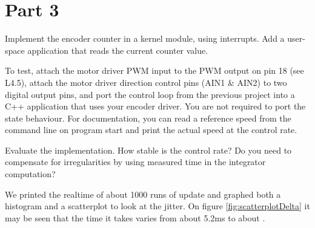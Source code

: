 \documentclass{article}
\begin{document}
\section{Part 3}

Implement the encoder counter in a kernel module, using interrupts.  Add a user-space application that reads the current counter value.

To test, attach the motor driver PWM input to the PWM output on pin 18 (see L4.5), attach the motor driver direction control pins (AIN1 & AIN2) to two digital output pins, and port the control loop from the previous project into a C++ application that uses your encoder driver.  You are not required to port the state behaviour.   For documentation, you can read a reference speed from the command line on program start and print the actual speed at the control rate. 

Evaluate the implementation.  How stable is the control rate?  Do you need to compensate for irregularities by using measured time in the integrator computation?

 


We printed the realtime of about 1000 runs of update and graphed both a histogram and a scatterplot to look at the jitter. On figure \ref{fig:scatterplotDelta} it may be seen that the time it takes varies from about 5.2ms to about .
\end{document}
